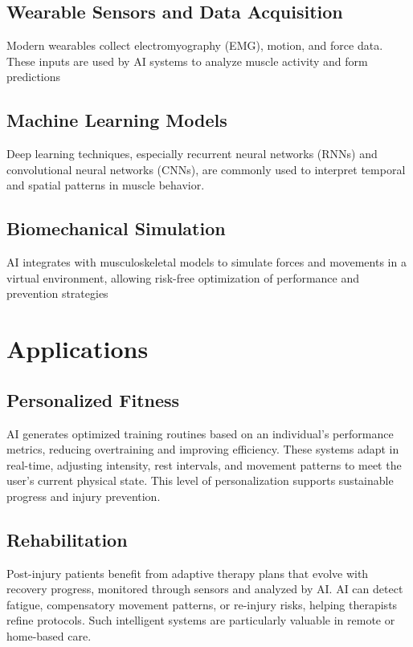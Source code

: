 \documentclass[a4paper,10pt,twocolumn]{memoir}
\begin{document}
\subsection{Wearable Sensors and Data Acquisition}
Modern wearables collect electromyography (EMG), motion, and force data. These inputs are used by AI systems to analyze muscle activity and form predictions

\subsection{Machine Learning Models}
Deep learning techniques, especially recurrent neural networks (RNNs) and convolutional neural networks (CNNs), are commonly used to interpret temporal and spatial patterns in muscle behavior.

\subsection{Biomechanical Simulation}
AI integrates with musculoskeletal models to simulate forces and movements in a virtual environment, allowing risk-free optimization of performance and prevention strategies 


\section*{Applications}

\subsection{Personalized Fitness}
AI generates optimized training routines based on an individual's performance metrics, reducing overtraining and improving efficiency. These systems adapt in real-time, adjusting intensity, rest intervals, and movement patterns to meet the user's current physical state. This level of personalization supports sustainable progress and injury prevention.

\subsection{Rehabilitation}
Post-injury patients benefit from adaptive therapy plans that evolve with recovery progress, monitored through sensors and analyzed by AI. AI can detect fatigue, compensatory movement patterns, or re-injury risks, helping therapists refine protocols. Such intelligent systems are particularly valuable in remote or home-based care.
\end{document}
